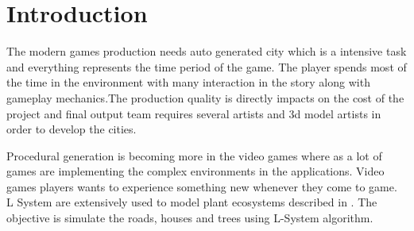 \chapter{Introduction}

\large The modern games production needs auto generated city which is a intensive task and everything represents the time period  of the game. The player spends most of the time in the environment with many interaction in the story along with gameplay mechanics\cite{abrahamcity}.The production quality is directly impacts on the cost of the project and final output team requires several artists and 3d model artists in order to develop the cities.

\vspace{0.5cm}

\large Procedural generation is becoming more in the video games where as a lot of games are implementing the complex environments in the applications. Video games players wants to experience something new whenever they come to game. L System are extensively used to model plant ecosystems described in \cite{parish2001procedural}. The objective is simulate the roads, houses and trees using L-System algorithm. 


